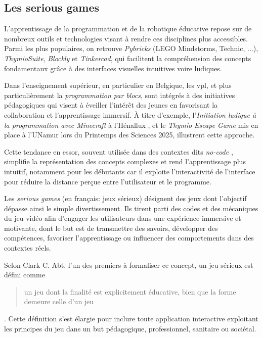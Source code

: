 \subsection{Les serious games} \label{sec:serious_game}
L’apprentissage de la programmation et de la robotique éducative repose sur de nombreux outils et technologies visant à rendre ces disciplines plus accessibles.
Parmi les plus populaires, on retrouve \textit{Pybricks} (LEGO Mindstorms, Technic, ...), \textit{ThymioSuite}, \textit{Blockly} et \textit{Tinkercad}, qui facilitent la compréhension des concepts fondamentaux grâce à des interfaces visuelles intuitives voire ludiques. 

Dans l'enseignement supérieur, en particulier en Belgique, les \acrfull{vpl}, et plus particulièrement la \textit{programmation par blocs}, sont intégrés à des initiatives pédagogiques qui visent à éveiller l’intérêt des jeunes en favorisant la collaboration et l'apprentissage immersif.
À titre d’exemple, l’\textit{Initiation ludique à la programmation avec Minecraft} à l’Hénallux \autocite{christophe_leclere_initiation_2020}, et le \textit{Thymio Escape Game} \autocite{christian_giang_thymio_nodate} mis en place à l’UNamur lors du Printemps des Sciences 2025, illustrent cette approche.

Cette tendance en essor, souvent utilisée dans des contextes dits \textit{no-code} \autocites{noauthor_software_nodate}, simplifie la représentation des concepts complexes et rend l’apprentissage plus intuitif, notamment pour les débutants \autocites{noauthor_visual_2025}{batni_current_2025} car il exploite l’interactivité de l’interface pour réduire la distance perçue entre l’utilisateur et le programme.

Les \textit{serious games} (en français: jeux sérieux) désignent des jeux dont l'objectif dépasse ainsi le simple divertissement.
Ils tirent parti des codes et des mécaniques du jeu vidéo afin d’engager les utilisateurs dans une expérience immersive et motivante, dont le but est de transmettre des savoirs, développer des compétences, favoriser l’apprentissage ou influencer des comportements dans des contextes réels.

Selon Clark C. Abt, l’un des premiers à formaliser ce concept, un jeu sérieux est défini comme \blockquote{un jeu dont la finalité est explicitement éducative, bien que la forme demeure celle d’un jeu} \autocite{abt_serious_1970}.
Cette définition s’est élargie pour inclure toute application interactive exploitant les principes du jeu dans un but pédagogique, professionnel, sanitaire ou sociétal.

